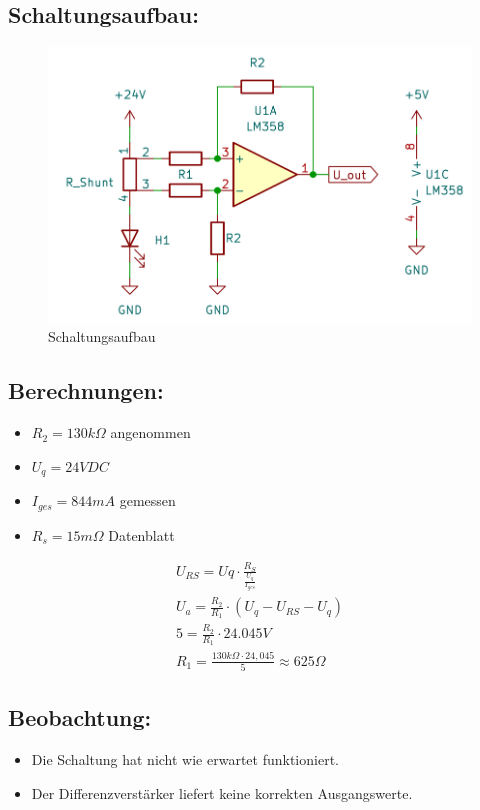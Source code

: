 \documentclass[12pt, a4paper]{article}
\begin{document}
\subsection{Schaltungsaufbau:}
    \begin{figure}[hbtp]
		\centering
		\includegraphics[width=1\textwidth]{images/sch.png}
		\caption{Schaltungsaufbau}
		\label{fig:HUB-Analyse}
	\end{figure}

\newpage

\subsection{Berechnungen:}
\begin{itemize}
\item $R_2=130k\Omega$ angenommen
\item $U_q = 24VDC$
\item $I_{ges}=844mA$ gemessen
\item $R_s = 15m\Omega$ Datenblatt \cite{RS}
\end{itemize}

\begin{align}
U_{RS} = Uq \cdot \frac{R_S}{\frac{U_q}{I_{ges}}}\\
U_a = \frac{R_2}{R_1}\cdot (U_q-U_{RS}-U_q)\\
5 = \frac{R_2}{R_1}\cdot 24.045V\\
R_1 = \frac{130k\Omega \cdot 24,045}{5} \approx 625\Omega
\end{align}


\subsection{Beobachtung:}
\begin{itemize}
    \item Die Schaltung hat nicht wie erwartet funktioniert.
    \item Der Differenzverstärker liefert keine korrekten Ausgangswerte.
\end{itemize}
\end{document}
